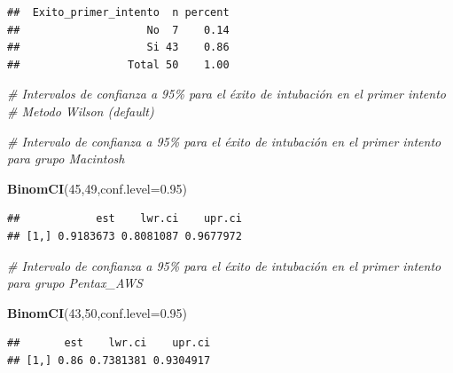 \documentclass[
]{article}
\newenvironment{Shaded}{\begin{snugshade}}{\end{snugshade}}
\newcommand{\AttributeTok}[1]{\textcolor[rgb]{0.13,0.29,0.53}{#1}}
\newcommand{\CommentTok}[1]{\textcolor[rgb]{0.56,0.35,0.01}{\textit{#1}}}
\newcommand{\DecValTok}[1]{\textcolor[rgb]{0.00,0.00,0.81}{#1}}
\newcommand{\FloatTok}[1]{\textcolor[rgb]{0.00,0.00,0.81}{#1}}
\newcommand{\FunctionTok}[1]{\textcolor[rgb]{0.13,0.29,0.53}{\textbf{#1}}}
\newcommand{\NormalTok}[1]{#1}
\begin{document}
\begin{verbatim}
##  Exito_primer_intento  n percent
##                    No  7    0.14
##                    Si 43    0.86
##                 Total 50    1.00
\end{verbatim}

\begin{Shaded}
\begin{Highlighting}[]
\CommentTok{\# Intervalos de confianza a 95\% para el éxito de intubación en el primer intento }
\CommentTok{\# Metodo Wilson (default)}

\CommentTok{\# Intervalo de confianza a 95\% para el éxito de intubación en el primer intento para grupo Macintosh}

\FunctionTok{BinomCI}\NormalTok{(}\DecValTok{45}\NormalTok{,}\DecValTok{49}\NormalTok{,}\AttributeTok{conf.level=}\FloatTok{0.95}\NormalTok{)}
\end{Highlighting}
\end{Shaded}

\begin{verbatim}
##            est    lwr.ci    upr.ci
## [1,] 0.9183673 0.8081087 0.9677972
\end{verbatim}

\begin{Shaded}
\begin{Highlighting}[]
\CommentTok{\# Intervalo de confianza a 95\% para el éxito de intubación en el primer intento para grupo Pentax\_AWS}

\FunctionTok{BinomCI}\NormalTok{(}\DecValTok{43}\NormalTok{,}\DecValTok{50}\NormalTok{,}\AttributeTok{conf.level=}\FloatTok{0.95}\NormalTok{)}
\end{Highlighting}
\end{Shaded}

\begin{verbatim}
##       est    lwr.ci    upr.ci
## [1,] 0.86 0.7381381 0.9304917
\end{verbatim}
\end{document}
